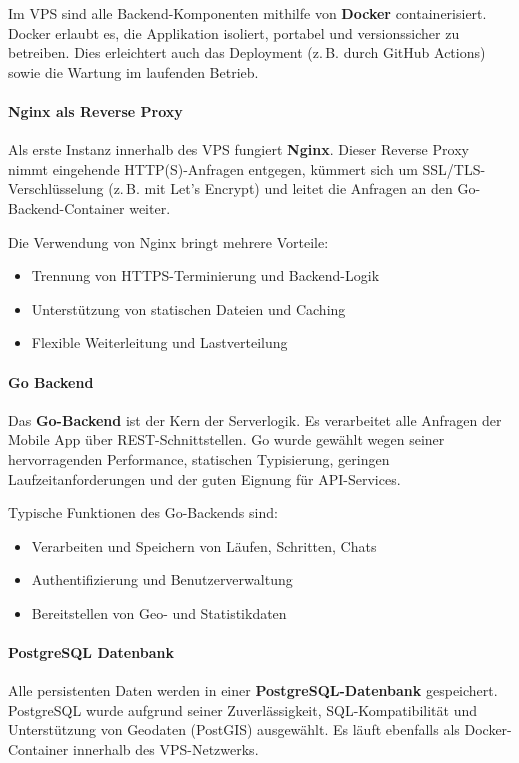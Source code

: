 \documentclass[11pt,a4paper]{article}
\begin{document}
Im VPS sind alle Backend-Komponenten mithilfe von \textbf{Docker} containerisiert. Docker erlaubt es, die Applikation isoliert, portabel und versionssicher zu betreiben. Dies erleichtert auch das Deployment (z.\,B. durch GitHub Actions) sowie die Wartung im laufenden Betrieb.

\paragraph{Nginx als Reverse Proxy}
Als erste Instanz innerhalb des VPS fungiert \textbf{Nginx}. Dieser Reverse Proxy nimmt eingehende HTTP(S)-Anfragen entgegen, kümmert sich um SSL/TLS-Verschlüsselung (z.\,B. mit Let's Encrypt) und leitet die Anfragen an den Go-Backend-Container weiter.

Die Verwendung von Nginx bringt mehrere Vorteile:
\begin{itemize}
    \item Trennung von HTTPS-Terminierung und Backend-Logik
    \item Unterstützung von statischen Dateien und Caching
    \item Flexible Weiterleitung und Lastverteilung
\end{itemize}

\paragraph{Go Backend}
Das \textbf{Go-Backend} ist der Kern der Serverlogik. Es verarbeitet alle Anfragen der Mobile App über REST-Schnittstellen. Go wurde gewählt wegen seiner hervorragenden Performance, statischen Typisierung, geringen Laufzeitanforderungen und der guten Eignung für API-Services.

Typische Funktionen des Go-Backends sind:
\begin{itemize}
    \item Verarbeiten und Speichern von Läufen, Schritten, Chats
    \item Authentifizierung und Benutzerverwaltung
    \item Bereitstellen von Geo- und Statistikdaten
\end{itemize}

\paragraph{PostgreSQL Datenbank}
Alle persistenten Daten werden in einer \textbf{PostgreSQL-Datenbank} gespeichert. PostgreSQL wurde aufgrund seiner Zuverlässigkeit, SQL-Kompatibilität und Unterstützung von Geodaten (PostGIS) ausgewählt. Es läuft ebenfalls als Docker-Container innerhalb des VPS-Netzwerks.
\end{document}
